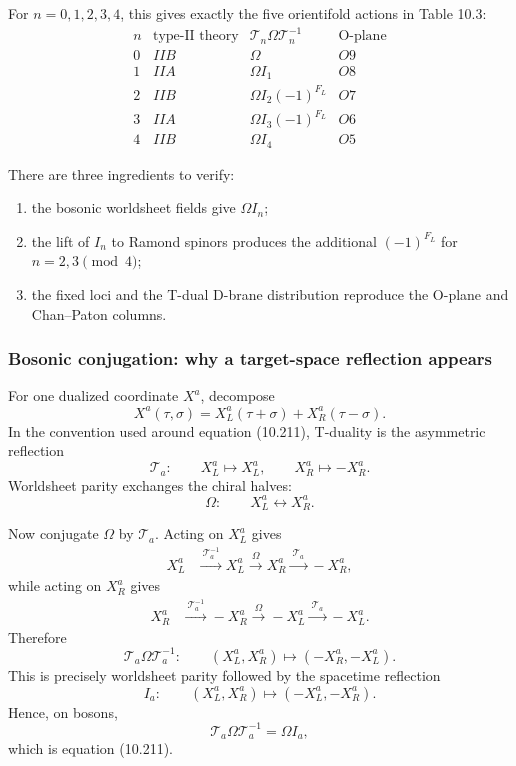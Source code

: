 \documentclass[
  10pt,
  a4paper,
  openany]{book}
\providecommand{\tightlist}{%
  \setlength{\itemsep}{0pt}\setlength{\parskip}{0pt}}
\begin{document}
For \(n=0,1,2,3,4\), this gives exactly the five orientifold actions in
Table 10.3: \[
\begin{array}{c|c|c|c}
n
&
\text{type-II theory}
&
\mathcal T_n\Omega\mathcal T_n^{-1}
&
\text{O-plane}
\\ \hline
0&IIB&\Omega&O9\\
1&IIA&\Omega I_1&O8\\
2&IIB&\Omega I_2(-1)^{F_L}&O7\\
3&IIA&\Omega I_3(-1)^{F_L}&O6\\
4&IIB&\Omega I_4&O5
\end{array}
\]

There are three ingredients to verify:

\begin{enumerate}
\def\labelenumi{\arabic{enumi}.}
\tightlist
\item
  the bosonic worldsheet fields give \(\Omega I_n\);
\item
  the lift of \(I_n\) to Ramond spinors produces the additional
  \((-1)^{F_L}\) for \(n=2,3\pmod4\);
\item
  the fixed loci and the T-dual D-brane distribution reproduce the
  O-plane and Chan--Paton columns.
\end{enumerate}

\subsubsection{Bosonic conjugation: why a target-space reflection
appears}\label{bosonic-conjugation-why-a-target-space-reflection-appears}

For one dualized coordinate \(X^a\), decompose \[
X^a(\tau,\sigma)
=
X_L^a(\tau+\sigma)
+
X_R^a(\tau-\sigma).
\] In the convention used around equation (10.211), T-duality is the
asymmetric reflection \[
\mathcal T_a:
\qquad
X_L^a\longmapsto X_L^a,
\qquad
X_R^a\longmapsto-X_R^a.
\] Worldsheet parity exchanges the chiral halves: \[
\Omega:
\qquad
X_L^a\longleftrightarrow X_R^a.
\]

Now conjugate \(\Omega\) by \(\mathcal T_a\). Acting on \(X_L^a\) gives
\[
\begin{aligned}
X_L^a
&\xrightarrow{\ \mathcal T_a^{-1}\ }
X_L^a
\xrightarrow{\ \Omega\ }
X_R^a
\xrightarrow{\ \mathcal T_a\ }
-X_R^a,
\end{aligned}
\] while acting on \(X_R^a\) gives \[
\begin{aligned}
X_R^a
&\xrightarrow{\ \mathcal T_a^{-1}\ }
-X_R^a
\xrightarrow{\ \Omega\ }
-X_L^a
\xrightarrow{\ \mathcal T_a\ }
-X_L^a.
\end{aligned}
\] Therefore \[
\mathcal T_a\Omega\mathcal T_a^{-1}:
\qquad
(X_L^a,X_R^a)
\longmapsto
(-X_R^a,-X_L^a).
\] This is precisely worldsheet parity followed by the spacetime
reflection \[
I_a:
\qquad
(X_L^a,X_R^a)
\longmapsto
(-X_L^a,-X_R^a).
\] Hence, on bosons, \[
\boxed{
\mathcal T_a\Omega\mathcal T_a^{-1}
=
\Omega I_a
},
\] which is equation (10.211).
\end{document}
